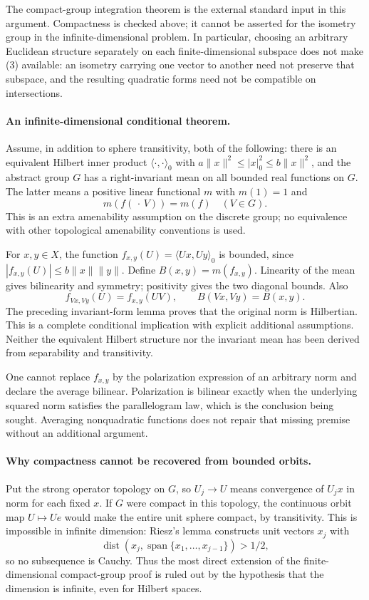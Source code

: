 \documentclass[11pt]{article}
\begin{document}
The compact-group integration theorem is the external standard input
in this argument. Compactness is checked above; it cannot be asserted
for the isometry group in the infinite-dimensional problem.
In particular, choosing an arbitrary Euclidean structure separately
on each finite-dimensional subspace does not make (3) available:
an isometry carrying one vector to another need not preserve that
subspace, and the resulting quadratic forms need not be compatible
on intersections.

\paragraph{An infinite-dimensional conditional theorem.}
Assume, in addition to sphere transitivity, both of the following:
there is an equivalent Hilbert inner product $\langle\cdot,\cdot\rangle_0$
with $a\|x\|^2\le|x|_0^2\le b\|x\|^2$, and the abstract group $G$
has a right-invariant mean on all bounded real functions on $G$.
The latter means a positive linear functional $m$ with $m(1)=1$ and
\[
                m(f(\,\cdot\,V))=m(f)\quad(V\in G).
\]
This is an extra amenability assumption on the discrete group;
no equivalence with other topological amenability conventions is used.

For $x,y\in X$, the function
$f_{x,y}(U)=\langle Ux,Uy\rangle_0$ is bounded, since
$|f_{x,y}(U)|\le b\|x\|\|y\|$. Define $B(x,y)=m(f_{x,y})$.
Linearity of the mean gives bilinearity and symmetry; positivity gives
the two diagonal bounds. Also
\[
 f_{Vx,Vy}(U)=f_{x,y}(UV),\qquad B(Vx,Vy)=B(x,y).
\]
The preceding invariant-form lemma proves that the original norm is
Hilbertian. This is a complete conditional implication with explicit
additional assumptions. Neither the equivalent Hilbert structure nor
the invariant mean has been derived from separability and transitivity.

One cannot replace $f_{x,y}$ by the polarization expression of an
arbitrary norm and declare the average bilinear. Polarization is
bilinear exactly when the underlying squared norm satisfies the
parallelogram law, which is the conclusion being sought. Averaging
nonquadratic functions does not repair that missing premise without
an additional argument.

\paragraph{Why compactness cannot be recovered from bounded orbits.}
Put the strong operator topology on $G$, so $U_j\to U$ means convergence
of $U_jx$ in norm for each fixed $x$. If $G$ were compact in this topology,
the continuous orbit map $U\mapsto Ue$ would make the entire unit sphere
compact, by transitivity. This is impossible in infinite dimension:
Riesz's lemma constructs unit vectors $x_j$ with
\[
 \operatorname{dist}(x_j,\operatorname{span}\{x_1,\ldots,x_{j-1}\})
       >1/2,
\]
so no subsequence is Cauchy. Thus the most direct extension of the
finite-dimensional compact-group proof is ruled out by the hypothesis
that the dimension is infinite, even for Hilbert spaces.
\end{document}
